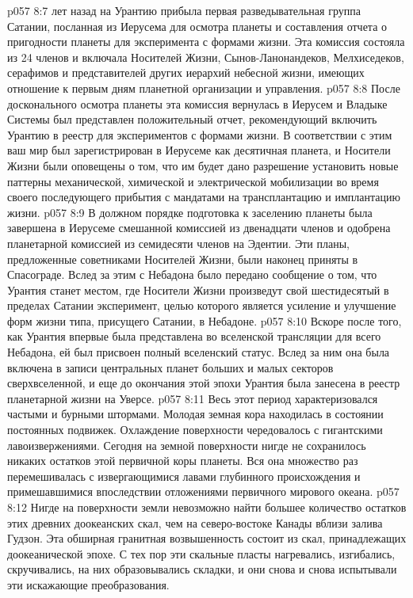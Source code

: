\vs p057 8:7 \pc {} лет назад на Урантию прибыла первая разведывательная группа Сатании, посланная из Иерусема для осмотра планеты и составления отчета о пригодности планеты для эксперимента с формами жизни. Эта комиссия состояла из 24 членов и включала Носителей Жизни, Сынов\hyp{}Ланонандеков, Мелхиседеков, серафимов и представителей других иерархий небесной жизни, имеющих отношение к первым дням планетной организации и управления.
\vs p057 8:8 После досконального осмотра планеты эта комиссия вернулась в Иерусем и Владыке Системы был представлен положительный отчет, рекомендующий включить Урантию в реестр для экспериментов с формами жизни. В соответствии с этим ваш мир был зарегистрирован в Иерусеме как десятичная планета, и Носители Жизни были оповещены о том, что им будет дано разрешение установить новые паттерны механической, химической и электрической мобилизации во время своего последующего прибытия с мандатами на трансплантацию и имплантацию жизни.
\vs p057 8:9 В должном порядке подготовка к заселению планеты была завершена в Иерусеме смешанной комиссией из двенадцати членов и одобрена планетарной комиссией из семидесяти членов на Эдентии. Эти планы, предложенные советниками Носителей Жизни, были наконец приняты в Спасограде. Вслед за этим с Небадона было передано сообщение о том, что Урантия станет местом, где Носители Жизни произведут свой шестидесятый в пределах Сатании эксперимент, целью которого является усиление и улучшение форм жизни типа, присущего Сатании, в Небадоне.
\vs p057 8:10 Вскоре после того, как Урантия впервые была представлена во вселенской трансляции для всего Небадона, ей был присвоен полный вселенский статус. Вслед за ним она была включена в записи центральных планет больших и малых секторов сверхвселенной, и еще до окончания этой эпохи Урантия была занесена в реестр планетарной жизни на Уверсе.
\vs p057 8:11 \pc Весь этот период характеризовался частыми и бурными штормами. Молодая земная кора находилась в состоянии постоянных подвижек. Охлаждение поверхности чередовалось с гигантскими лавоизвержениями. Сегодня на земной поверхности нигде не сохранилось никаких остатков этой первичной коры планеты. Вся она множество раз перемешивалась с извергающимися лавами глубинного происхождения и примешавшимися впоследствии отложениями первичного мирового океана.
\vs p057 8:12 Нигде на поверхности земли невозможно найти большее количество остатков этих древних доокеанских скал, чем на северо\hyp{}востоке Канады вблизи залива Гудзон. Эта обширная гранитная возвышенность состоит из скал, принадлежащих доокеанической эпохе. С тех пор эти скальные пласты нагревались, изгибались, скручивались, на них образовывались складки, и они снова и снова испытывали эти искажающие преобразования.
